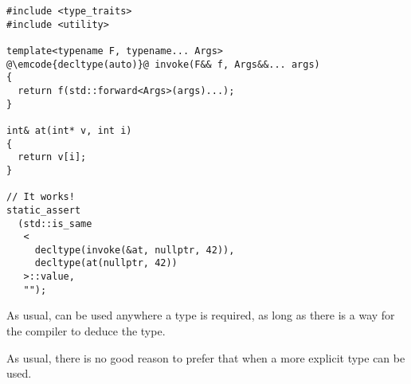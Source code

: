 \begin{lstlisting}
#include <type_traits>
#include <utility>

template<typename F, typename... Args>
@\emcode{decltype(auto)}@ invoke(F&& f, Args&&... args)
{
  return f(std::forward<Args>(args)...);
}

int& at(int* v, int i)
{
  return v[i];
}

// It works!
static_assert
  (std::is_same
   <
     decltype(invoke(&at, nullptr, 42)),
     decltype(at(nullptr, 42))
   >::value,
   "");
\end{lstlisting}

As usual,  can be used anywhere a type is
required, as long as there is a way for the compiler to deduce the
type.

As usual, there is no good reason to prefer that when a more explicit
type can be used.
